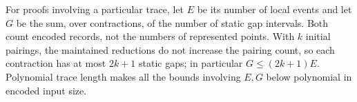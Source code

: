 For proofs involving a particular trace, let $E$ be its number of local events
and let $G$ be the sum, over contractions, of the number of static gap intervals.
Both count encoded records, not the numbers of represented points. With $k$
initial pairings, the maintained reductions do not increase the pairing count,
so each contraction has at most $2k+1$ static gaps; in particular
$G\le(2k+1)E$. Polynomial trace length makes all the bounds involving $E,G$
below polynomial in encoded input size.
